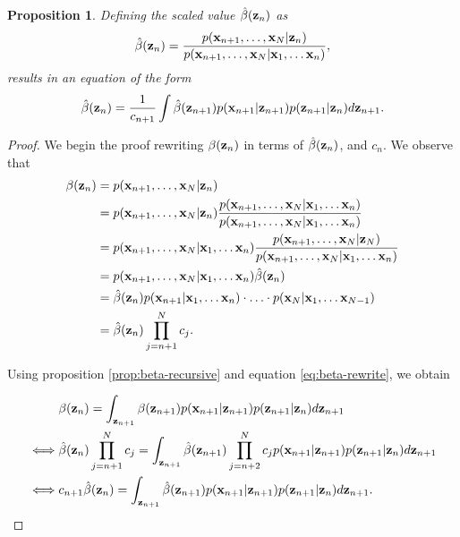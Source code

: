 \documentclass[11pt]{article}
\numberwithin{equation}{section}
\newcommand{\x}{{\bf x}}
\newcommand{\z}{{\bf z}}
\newtheorem{proposition}{Proposition}[section]
\begin{document}
\begin{proposition} \label{prop:beta-hat}
	Defining the scaled value $\hat\beta(\z_n)$ as
	\begin{equation}
		\hat\beta(\z_n) = \frac{p(\x_{n+1}, \ldots, \x_N \vert \z_n)}{p(\x_{n+1}, \ldots, \x_N \vert \x_1, \ldots \x_n)},
	\end{equation}
	results in an equation of the form
	\begin{equation}
		\hat\beta(\z_n) = \frac{1}{c_{n+1}}\int \hat\beta(\z_{n+1})p(\x_{n+1}\vert\z_{n+1})p(\z_{n+1}\vert\z_n) d\z_{n+1}.
	\end{equation}
\end{proposition}

\begin{proof}
	We begin the proof rewriting $\beta(\z_n)$ in terms of $\hat\beta(\z_n)$, and $c_n$. We observe that
	\begin{align}
		\beta(\z_n) &= p(\x_{n+1}, \ldots, \x_N \vert \z_n)\\
		&= p(\x_{n+1}, \ldots, \x_N \vert \z_n) \frac{p(\x_{n+1}, \ldots, \x_N \vert \x_1, \ldots \x_n)}{p(\x_{n+1}, \ldots, \x_N \vert \x_1, \ldots \x_n)} \\
		&= p(\x_{n+1}, \ldots, \x_N \vert \x_1, \ldots \x_n) \frac{p(\x_{n+1}, \ldots, \x_N \vert \z_N)}{p(\x_{n+1}, \ldots, \x_N \vert \x_1, \ldots \x_n)}\\
		&= p(\x_{n+1}, \ldots, \x_N \vert \x_1, \ldots \x_n) \hat\beta(\z_n)\\
		&= \hat\beta(\z_n) p(\x_{n+1} \vert \x_1, \ldots \x_n) \cdot \ldots \cdot p(\x_{N} \vert \x_1, \ldots \x_{N-1})\\
		&= \hat\beta(\z_n) \prod_{j=n+1}^N c_j \label{eq:beta-rewrite}.
	\end{align}
	
	Using proposition \ref{prop:beta-recursive} and equation \eqref{eq:beta-rewrite}, we obtain
	
	\begin{align}
		&\beta(\z_n) = \int_{\z_{n+1}} \beta(\z_{n+1})p(\x_{n+1}\vert \z_{n+1}) p(\z_{n+1}\vert \z_n) d\z_{n+1}\\
		\iff& \hat\beta(\z_n) \prod_{j=n+1}^N c_j = \int_{\z_{n+1}}\hat\beta(\z_{n+1}) \prod_{j=n+2}^N c_jp(\x_{n+1}\vert \z_{n+1}) p(\z_{n+1}\vert \z_n) d\z_{n+1}\\
		\iff& c_{n+1} \hat\beta(\z_n) = \int_{\z_{n+1}} \hat\beta(\z_{n+1}) p(\x_{n+1}\vert \z_{n+1}) p(\z_{n+1}\vert \z_n) d\z_{n+1}.
	\end{align}
\end{proof}
\end{document}
